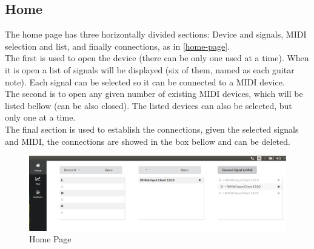 \subsection{Home}
The home page has three horizontally divided sections: Device and signals, MIDI selection
and list, and  finally connections, as in \autoref{home-page}. \\
The first is used to open the device (there can be only one used at a time). When it
is open a list of signals will be displayed (six of them, named as each guitar note).
Each signal can be selected so it can be connected to a MIDI device.\\
The second is to open any given number of existing MIDI devices, which will be listed
bellow (can be also closed). The listed devices can also be selected, but only one at a time. \\
The final section is used to establish the connections, given the selected signals
and MIDI, the connections are showed in the box bellow and can be deleted.
\begin{figure}[htb]
	\caption{Home Page}
  \label{home-page}
	\begin{center}
    \includegraphics[width=0.7\paperwidth]{images/snapshots/home.png}
	\end{center}
\end{figure}

